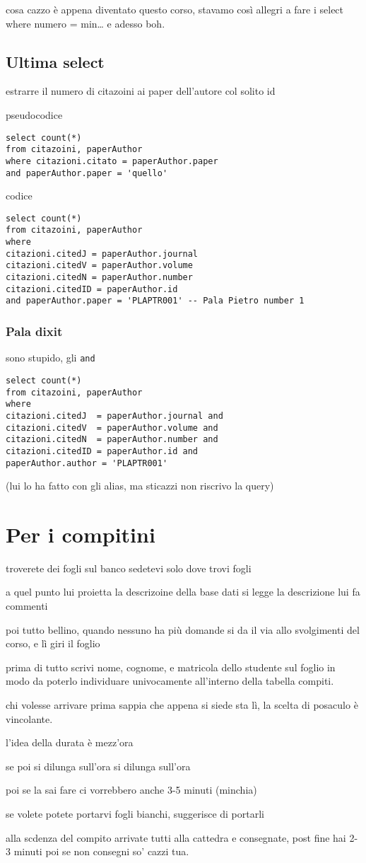 \documentclass[11pt]{article}
\begin{document}
cosa cazzo è appena diventato questo corso, stavamo così allegri a fare i select where
numero = min\ldots{} e adesso boh.

\subsection{Ultima select}
\label{sec:org351b61a}
estrarre il numero di citazoini ai paper dell'autore col solito id

pseudocodice
\begin{verbatim}
select count(*)
from citazoini, paperAuthor
where citazioni.citato = paperAuthor.paper
and paperAuthor.paper = 'quello'
\end{verbatim}

codice
\begin{verbatim}
select count(*)
from citazoini, paperAuthor
where
citazioni.citedJ = paperAuthor.journal
citazioni.citedV = paperAuthor.volume
citazioni.citedN = paperAuthor.number
citazioni.citedID = paperAuthor.id
and paperAuthor.paper = 'PLAPTR001' -- Pala Pietro number 1
\end{verbatim}

\subsubsection{Pala dixit}
\label{sec:orgc628b82}
sono stupido, gli \texttt{and}
\begin{verbatim}
select count(*)
from citazoini, paperAuthor
where
citazioni.citedJ  = paperAuthor.journal and
citazioni.citedV  = paperAuthor.volume and
citazioni.citedN  = paperAuthor.number and
citazioni.citedID = paperAuthor.id and
paperAuthor.author = 'PLAPTR001'
\end{verbatim}

(lui lo ha fatto con gli alias, ma sticazzi non riscrivo la query)

\section{Per i compitini}
\label{sec:orgea3a55c}
troverete dei fogli sul banco
sedetevi solo dove trovi fogli

a quel punto lui proietta la descrizoine della base dati
si legge la descrizione
lui fa commenti

poi tutto bellino, quando nessuno ha più domande si da il via allo svolgimenti del corso,
e lì giri il foglio

prima di tutto scrivi nome, cognome, e matricola dello studente sul foglio in modo da
poterlo individuare univocamente all'interno della tabella compiti.

chi volesse arrivare prima sappia che appena si siede sta lì, la scelta di posaculo è
vincolante.

l'idea della durata è mezz'ora

se poi si dilunga sull'ora si dilunga sull'ora

poi se la sai fare ci vorrebbero anche 3-5 minuti (minchia)

se volete potete portarvi fogli bianchi, suggerisce di portarli

alla scdenza del compito arrivate tutti alla cattedra e consegnate, post fine hai 2-3
minuti poi se non consegni so' cazzi tua.
\end{document}

